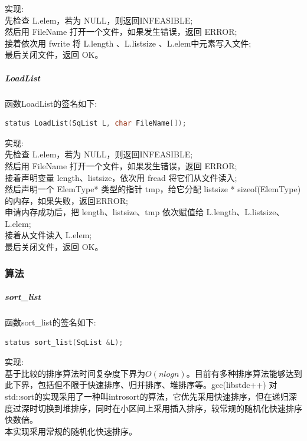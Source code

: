 \documentclass[supercite]{Experimental_Report}
\theoremstyle{definition}
\begin{document}
\noindent
实现: \\
先检查 L.elem，若为 NULL，则返回INFEASIBLE; \\
然后用 FileName 打开一个文件，如果发生错误，返回 ERROR; \\
接着依次用 fwrite 将 L.length 、L.listsize 、L.elem中元素写入文件; \\
最后关闭文件，返回 OK。\\

\subparagraph{LoadList}
\noindent
函数LoadList的签名如下:
\begin{lstlisting}[language=C++, frame=single]
status LoadList(SqList L, char FileName[]);
\end{lstlisting}

\noindent
实现: \\
先检查 L.elem，若为 NULL，则返回INFEASIBLE; \\
然后用 FileName 打开一个文件，如果发生错误，返回 ERROR; \\
接着声明变量 length、listsize，依次用 fread 将它们从文件读入; \\
然后声明一个 ElemType* 类型的指针 tmp，给它分配 listsize * sizeof(ElemType) 的内存，如果失败，返回ERROR; \\
申请内存成功后，把 length、listsize、tmp 依次赋值给 L.length、L.listsize、L.elem; \\
接着从文件读入 L.elem; \\
最后关闭文件，返回 OK。\\

\newpage

\subsubsection{算法}

\subparagraph{sort\_list}
\noindent
函数sort\_list的签名如下:
\begin{lstlisting}[language=C++, frame=single]
status sort_list(SqList &L);
\end{lstlisting}

\noindent
实现: \\
基于比较的排序算法时间复杂度下界为$O(nlogn)$。目前有多种排序算法能够达到此下界，包括但不限于快速排序、归并排序、堆排序等。gcc(libstdc++) 对std::sort的实现采用了一种叫introsort的算法，它优先采用快速排序，但在递归深度过深时切换到堆排序，同时在小区间上采用插入排序，较常规的随机化快速排序快数倍。\\
本实现采用常规的随机化快速排序。\\
\end{document}

